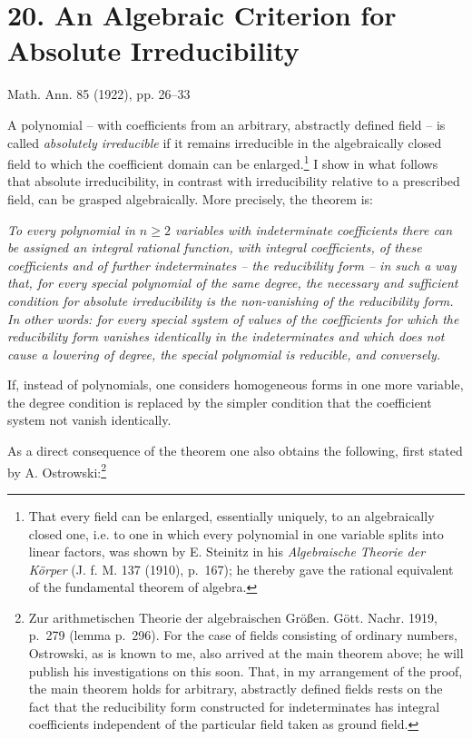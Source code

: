 \documentclass[11pt]{article}
\begin{document}
\setcounter{footnote}{0}
\section*{20. An Algebraic Criterion for Absolute Irreducibility}
\begin{center}
Math. Ann. 85 (1922), pp. 26--33
\end{center}

A polynomial -- with coefficients from an arbitrary, abstractly defined field -- is called \emph{absolutely irreducible} if it remains irreducible in the algebraically closed field to which the coefficient domain can be enlarged.\footnote{That every field can be enlarged, essentially uniquely, to an algebraically closed one, i.e. to one in which every polynomial in one variable splits into linear factors, was shown by E. Steinitz in his \emph{Algebraische Theorie der Körper} (J. f. M. 137 (1910), p.~167); he thereby gave the rational equivalent of the fundamental theorem of algebra.} I show in what follows that absolute irreducibility, in contrast with irreducibility relative to a prescribed field, can be grasped algebraically. More precisely, the theorem is:

\emph{To every polynomial in $n\ge2$ variables with indeterminate coefficients there can be assigned an integral rational function, with integral coefficients, of these coefficients and of further indeterminates -- the reducibility form -- in such a way that, for every special polynomial of the same degree, the necessary and sufficient condition for absolute irreducibility is the non-vanishing of the reducibility form. In other words: for every special system of values of the coefficients for which the reducibility form vanishes identically in the indeterminates and which does not cause a lowering of degree, the special polynomial is reducible, and conversely.}

If, instead of polynomials, one considers homogeneous forms in one more variable, the degree condition is replaced by the simpler condition that the coefficient system not vanish identically.

As a direct consequence of the theorem one also obtains the following, first stated by A. Ostrowski:\footnote{Zur arithmetischen Theorie der algebraischen Größen. Gött. Nachr. 1919, p.~279 (lemma p.~296). For the case of fields consisting of ordinary numbers, Ostrowski, as is known to me, also arrived at the main theorem above; he will publish his investigations on this soon. That, in my arrangement of the proof, the main theorem holds for arbitrary, abstractly defined fields rests on the fact that the reducibility form constructed for indeterminates has integral coefficients independent of the particular field taken as ground field.}
\end{document}
